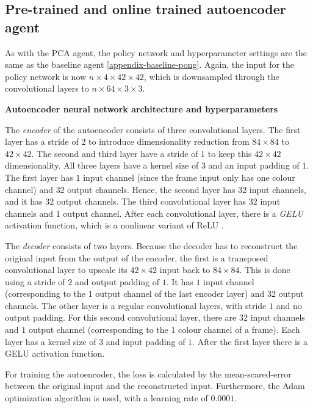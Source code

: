 \subsection{Pre-trained and online trained autoencoder agent} %
As with the PCA agent, the policy network and hyperparameter settings are the same as the baseline agent \ref{appendix-baseline-pong}. Again, the input for the policy network is now $n \times 4 \times 42 \times 42$, which is downsampled through the convolutional layers to $n \times 64 \times 3 \times 3$. \newline\par

\noindent \textbf{Autoencoder neural network architecture and hyperparameters}\par
\noindent The \emph{encoder} of the autoencoder consists of three convolutional layers. The first layer has a stride of $2$ to introduce dimensionality reduction from $84 \times 84$ to $42 \times 42$. The second and third layer have a stride of $1$ to keep this $42 \times 42$ dimensionality. All three layers have a kernel size of $3$ and an input padding of $1$. The first layer has $1$ input channel (since the frame input only has one colour channel) and $32$ output channels. Hence, the second layer has $32$ input channels, and it has $32$ output channels. The third convolutional layer has $32$ input channels and $1$ output channel. After each convolutional layer, there is a \emph{GELU} activation function, which is a nonlinear variant of ReLU \cite{gelu}.

The \emph{decoder} consists of two layers. Because the decoder has to reconstruct the original input from the output of the encoder, the first is a transposed convolutional layer to upscale its $42 \times 42$ input back to $84 \times 84$. This is done using a stride of $2$ and output padding of $1$. It has $1$ input channel (corresponding to the $1$ output channel of the last encoder layer) and $32$ output channels. The other layer is a regular convolutional layers, with stride $1$ and no output padding. For this second convolutional layer, there are $32$ input channels and $1$ output channel (corresponding to the $1$ colour channel of a frame). Each layer has a kernel size of $3$ and input padding of $1$. After the first layer there is a GELU activation function.

For training the autoencoder, the loss is calculated by the mean-scared-error between the original input and the reconstructed input. Furthermore, the Adam optimization algorithm is used, with a learning rate of $0.0001$. 
